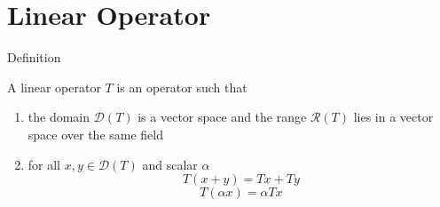 \section{Linear Operator}

\begin{frame}{Definition}
\begin{definition}
    A linear operator $T$ is an operator such that
    \begin{enumerate}
        \item the domain $\mathscr{D}(T)$ is a vector space and the range $\mathscr{R}(T)$ lies in a vector space over the same field
        \item for all $x,y\in\mathscr{D}(T)$ and scalar $\alpha$
        $$
        T(x+y) = Tx + Ty
        $$
        $$
        T(\alpha x) = \alpha Tx
        $$
    \end{enumerate}
\end{definition}
    
\end{frame}